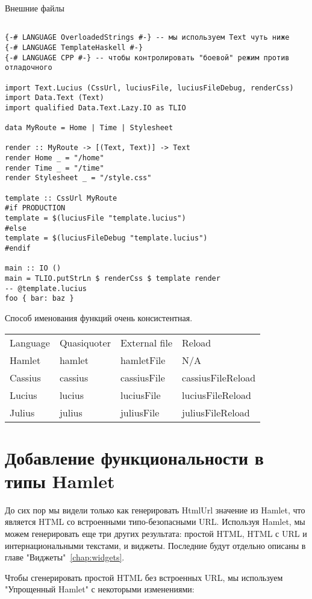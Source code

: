 Внешние файлы
\begin{lstlisting}

{-# LANGUAGE OverloadedStrings #-} -- мы используем Text чуть ниже
{-# LANGUAGE TemplateHaskell #-}
{-# LANGUAGE CPP #-} -- чтобы контролировать "боевой" режим против отладочного

import Text.Lucius (CssUrl, luciusFile, luciusFileDebug, renderCss)
import Data.Text (Text)
import qualified Data.Text.Lazy.IO as TLIO

data MyRoute = Home | Time | Stylesheet

render :: MyRoute -> [(Text, Text)] -> Text
render Home _ = "/home"
render Time _ = "/time"
render Stylesheet _ = "/style.css"

template :: CssUrl MyRoute
#if PRODUCTION
template = $(luciusFile "template.lucius")
#else
template = $(luciusFileDebug "template.lucius")
#endif

main :: IO ()
main = TLIO.putStrLn $ renderCss $ template render
-- @template.lucius
foo { bar: baz }
\end{lstlisting}

Способ именования функций очень консистентная.
\begin{tabular}{l l l l}
Language & Quasiquoter & External file & Reload \\
Hamlet   & hamlet      & hamletFile    & N/A    \\
Cassius  & cassius     & cassiusFile   & cassiusFileReload \\
Lucius   & lucius      & luciusFile    & luciusFileReload \\
Julius   & julius      & juliusFile    & juliusFileReload \\
\end{tabular}

\section{Добавление функциональности в типы Hamlet}
До сих пор мы видели только как генерировать HtmlUrl значение из Hamlet, что 
является HTML со встроенными типо-безопасными URL. Используя Hamlet, 
мы можем генерировать еще три других результата: простой HTML, HTML с URL и 
интернациональными текстами, и виджеты.
Последние будут отдельно описаны в главе "Виджеты"~\ref{chap:widgets}.

Чтобы сгенерировать простой HTML без встроенных URL, мы используем 
"Упрощенный Hamlet" с некоторыми изменениями:


